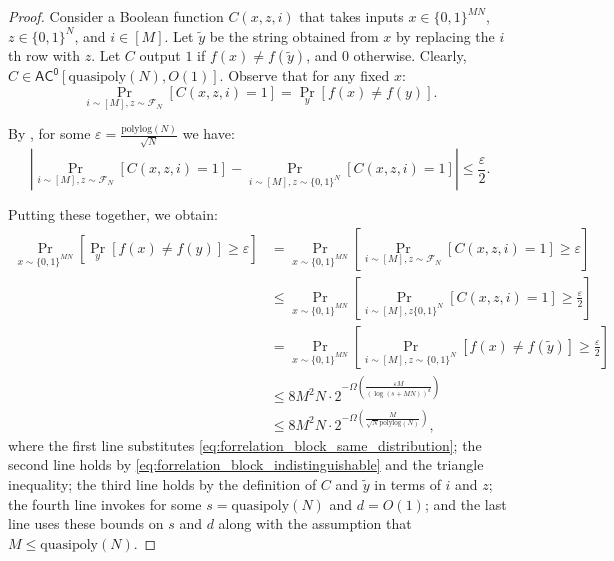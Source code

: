 \documentclass[10pt,a4paper]{article}
\newcommand{\eps}{\varepsilon}
\newcommand{\polylog}{\mathrm{polylog}}
\newcommand{\quasipoly}{\mathrm{quasipoly}}
\begin{document}
\begin{proof}
Consider a Boolean function $C(x, z, i)$ that takes inputs $x \in \{0,1\}^{MN}$, $z \in \{0,1\}^N$, and $i \in [M]$. Let $\tilde{y}$ be the string obtained from $x$ by replacing the $i$th row with $z$. Let $C$ output $1$ if $f(x) \neq f(\tilde{y})$, and $0$ otherwise. Clearly, $C \in \mathsf{AC^0}[\quasipoly(N), O(1)]$. Observe that for any fixed $x$:
\begin{equation}
\label{eq:forrelation_block_same_distribution}
\Pr_{i \sim [M],z \sim \mathcal{F}_N}\left[C(x, z, i) = 1\right] = \Pr_{y}[f(x) \neq f(y)].
\end{equation}

By , for some $\eps = \frac{\polylog(N)}{\sqrt{N}}$ we have:
\begin{equation}
\label{eq:forrelation_block_indistinguishable}
\left|\Pr_{i \sim [M],z \sim \mathcal{F}_N}\left[C(x, z, i) = 1\right] - \Pr_{i \sim [M],z \sim \{0,1\}^N}\left[C(x, z, i) = 1\right] \right| \le \frac{\eps}{2}.
\end{equation}

Putting these together, we obtain:
\begin{align*}
\Pr_{x \sim \{0,1\}^{MN}}\left[\Pr_y\left[f(x) \neq f(y)\right] \ge \eps \right]
&= \Pr_{x \sim \{0,1\}^{MN}}\left[\Pr_{i \sim [M], z \sim \mathcal{F}_N}\left[C(x, z, i) = 1\right] \ge \eps \right]\\
&\le \Pr_{x \sim \{0,1\}^{MN}}\left[\Pr_{i \sim [M], z \{0,1\}^N}\left[C(x, z, i) = 1\right] \ge \frac{\eps}{2} \right]\\
&= \Pr_{x \sim \{0,1\}^{MN}}\left[
\Pr_{i \sim [M],z \sim \{0,1\}^N}\left[f(x) \neq f(\tilde{y})\right]
\ge \frac{\eps}{2}
\right]\\
&\le 8M^2N \cdot 2^{-\Omega\left(\frac{\eps M}{(\log(s + MN))^d}\right)}\\
&\le 8M^2N \cdot 2^{-\Omega\left(\frac{M}{\sqrt{N} \polylog(N)}\right)},
\end{align*}
where the first line substitutes \eqref{eq:forrelation_block_same_distribution}; the second line holds by \eqref{eq:forrelation_block_indistinguishable} and the triangle inequality; the third line holds by the definition of $C$ and $\tilde{y}$ in terms of $i$ and $z$; the fourth line invokes  for some $s = \quasipoly(N)$ and $d = O(1)$; and the last line uses these bounds on $s$ and $d$ along with the assumption that $M \le \quasipoly(N)$.
\end{proof}
\end{document}
